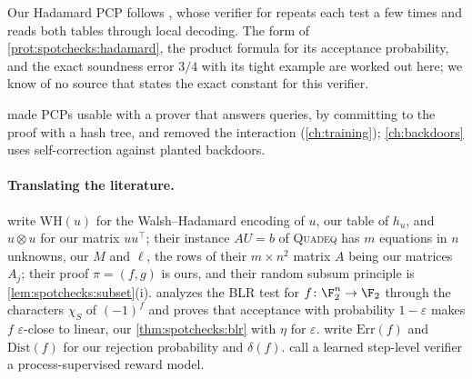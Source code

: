\begin{refsection}
Our Hadamard PCP follows \textcite[Chapter~11]{AroraBarak2009}, whose verifier for \spotchecksquadeq{} repeats each test a few times and reads both tables through local decoding. The form of \cref{prot:spotchecks:hadamard}, the product formula for its acceptance probability, and the exact soundness error $3/4$ with its tight example are worked out here; we know of no source that states the exact constant for this verifier.

\Textcite{Kilian1992} made PCPs usable with a prover that answers queries, by committing to the proof with a hash tree, and \textcite{Micali2000} removed the interaction (\cref{ch:training}); \cref{ch:backdoors} uses self-correction against planted backdoors.

\paragraph{Translating the literature.} \Textcite{AroraBarak2009} write $\mathrm{WH}(u)$ for the Walsh--Hadamard encoding of $u$, our table of $h_u$, and $u\otimes u$ for our matrix $uu^\top$; their instance $AU=b$ of \textsc{Quadeq} has $m$ equations in $n$ unknowns, our $M$ and $\ell$, the rows of their $m\times n^2$ matrix $A$ being our matrices $A_j$; their proof $\pi=(f,g)$ is ours, and their random subsum principle is \cref{lem:spotchecks:subset}(i). \Textcite{ODonnell2014} analyzes the BLR test for $f\colon\F_2^n\to\F_2$ through the characters $\chi_S$ of $(-1)^f$ and proves that acceptance with probability $1-\varepsilon$ makes $f$ $\varepsilon$-close to linear, our \cref{thm:spotchecks:blr} with $\eta$ for $\varepsilon$. \Textcite{BellareEtAl1996} write $\mathrm{Err}(f)$ and $\mathrm{Dist}(f)$ for our rejection probability and $\delta(f)$. \Textcite{LightmanEtAl2024} call a learned step-level verifier a process-supervised reward model.

\printchapterbib
\end{refsection}
